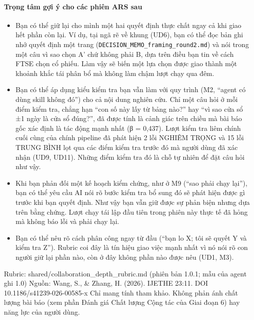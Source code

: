 \documentclass[12pt,a4paper]{article}
\providecommand{\tightlist}{\setlength{\itemsep}{0pt}\setlength{\parskip}{0pt}}
\begin{document}
\hypertarget{trux1ecdng-tuxe2m-gux1ee3i-uxfd-cho-cuxe1c-phiuxean-ars-sau}{%
\paragraph{Trọng tâm gợi ý cho các phiên ARS
sau}\label{trux1ecdng-tuxe2m-gux1ee3i-uxfd-cho-cuxe1c-phiuxean-ars-sau}}

\begin{itemize}
\tightlist
\item
  Bạn có thể giữ lại cho mình một hai quyết định thực chất ngay cả khi
  giao hết phần còn lại. Ví dụ, tại ngã rẽ về khung (UD6), bạn có thể
  đọc bản ghi nhớ quyết định một trang
  (\texttt{DECISION\_MEMO\_framing\_round2.md}) và nói trong một câu vì
  sao chọn A' chứ không phải B, dựa trên điều bạn tin về cách FTSE chọn
  cổ phiếu. Làm vậy sẽ biến một lựa chọn được giao thành một khoảnh khắc
  tái phân bổ mà không làm chậm lượt chạy qua đêm.
\item
  Bạn có thể áp dụng kiểu kiểm tra bạn vẫn làm với quy trình (M2,
  ``agent có dùng skill không đó'') cho cả nội dung nghiên cứu. Chỉ một
  câu hỏi ở mỗi điểm kiểm tra, chẳng hạn ``con số này lấy từ bảng nào?''
  hay ``vì sao cửa sổ ±1 ngày là cửa sổ đúng?'', đã được tính là cảnh
  giác trên chiều mà bài báo gốc xác định là tác động mạnh nhất (β =
  0,437). Lượt kiểm tra liêm chính cuối cùng của chính pipeline đã phát
  hiện 2 lỗi NGHIÊM TRỌNG và 15 lỗi TRUNG BÌNH lọt qua các điểm kiểm tra
  trước đó mà người dùng đã xác nhận (UD9, UD11). Những điểm kiểm tra đó
  là chỗ tự nhiên để đặt câu hỏi như vậy.
\item
  Khi bạn phản đối một kế hoạch kiểm chứng, như ở M9 (``sao phải chạy
  lại''), bạn có thể yêu cầu AI nói rõ bước kiểm tra bổ sung đó sẽ phát
  hiện được gì trước khi bạn quyết định. Như vậy bạn vẫn giữ được sự
  phản biện nhưng dựa trên bằng chứng. Lượt chạy tái lập đầu tiên trong
  phiên này thực tế đã hỏng mà không báo lỗi và phải chạy lại.
\item
  Bạn có thể nêu rõ cách phân công ngay từ đầu (``bạn lo X; tôi sẽ quyết
  Y và kiểm tra Z''). Rubric coi đây là tín hiệu giao việc mạnh nhất vì
  nó nói rõ con người giữ lại phần nào, còn ở đây không phần nào được
  nêu (UD1, M3).
\end{itemize}

Rubric: shared/collaboration\_depth\_rubric.md (phiên bản 1.0.1; mẫu của
agent ghi 1.0) Nguồn: Wang, S., \& Zhang, H. (2026). IJETHE 23:11. DOI
10.1186/s41239-026-00585-x Chỉ mang tính tham khảo. Không phản ánh chất
lượng bài báo (xem phần Đánh giá Chất lượng Cộng tác của Giai đoạn 6)
hay năng lực của người dùng.
\end{document}
